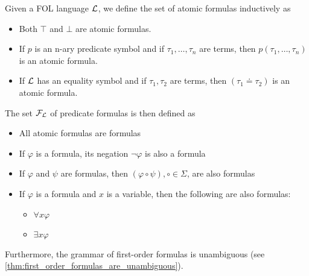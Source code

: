 \begin{definition}\label{def:first_order_formula}\cite[definition 2.5]{Nerode2012}
  Given a FOL language $\mathcal L$, we define the set of atomic formulas inductively as
  \begin{itemize}
    \item Both $\top$ and $\bot$ are atomic formulas.
    \item If $p$ is an n-ary predicate symbol and if $\tau_1, \ldots, \tau_n$ are terms, then $p(\tau_1, \ldots, \tau_n)$ is an atomic formula.
    \item If $\mathcal L$ has an equality symbol and if $\tau_1, \tau_2$ are terms, then $(\tau_1 \doteq \tau_2)$ is an atomic formula.
  \end{itemize}

  The set $\mathcal F_{\mathcal L}$ of predicate formulas is then defined as
  \begin{itemize}
    \item All atomic formulas are formulas
    \item If $\varphi$ is a formula, its negation $\neg \varphi$ is also a formula
    \item If $\varphi$ and $\psi$ are formulas, then $(\varphi \circ \psi), \circ \in \Sigma$, are also formulas
    \item If $\varphi$ is a formula and $x$ is a variable, then the following are also formulas:
    \begin{itemize}
      \item $\forall x \varphi$
      \item $\exists x \varphi$
    \end{itemize}
  \end{itemize}

  Furthermore, the grammar of first-order formulas is unambiguous (see \cref{thm:first_order_formulas_are_unambiguous}).


\end{definition}
